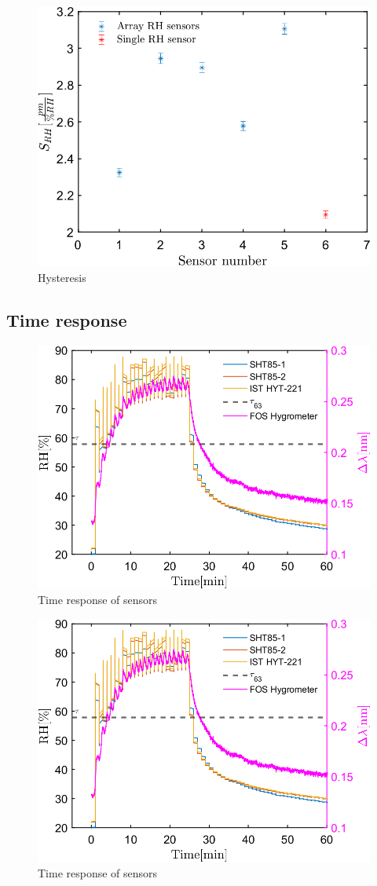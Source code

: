 \begin{figure}[!h]
\centering
\includegraphics[width=0.6\columnwidth]{Chapter5/images/comp1.png}
\caption{Hysteresis}
\label{fig_calibration1}
\end{figure}





\subsection{Time response}

\begin{figure}[!h]
\centering
\includegraphics[width=0.6\columnwidth]{Chapter5/images/20responseRH.png}
\caption{Time response of sensors}
\label{fig_time_response}
\end{figure}

\begin{figure}[!h]
\centering
\includegraphics[width=0.6\columnwidth]{Chapter5/images/20responseRH.png}
\caption{Time response of sensors}
\label{fig_time_response2}
\end{figure}


